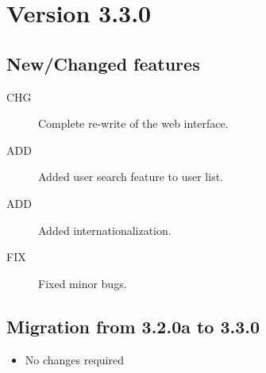 \section{Version 3.3.0}
\label{sec:3.3.0}

\subsection{New/Changed features}
\begin{description}
 	  \item[CHG] Complete re-write of the web interface.
	  \item[ADD] Added user search feature to user list.
	  \item[ADD] Added internationalization.
	  \item[FIX] Fixed minor bugs.
\end{description}

\subsection{Migration from 3.2.0a to 3.3.0}
\begin{itemize}
	\item No changes required
\end{itemize}